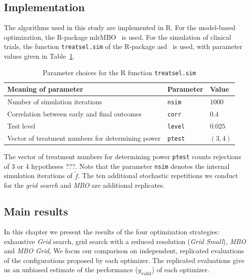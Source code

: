 \documentclass[bimj,fleqn]{w-art}
\theoremstyle{plain}
\theoremstyle{definition}
\begin{document}
\subsection{Implementation}

The algorithms used in this study are implemented in R.
For the model-based optimization, the R-package mlrMBO~\citep{bischl_mlrmbo_2017} is used.
For the simulation of clinical trials, the function \texttt{treatsel.sim} of the R-package asd~\citep{parsons_software_2011} is used, with parameter values given in Table~\ref{tab:par_implement}.
\begin{table}[h]
  \caption{Parameter choices for the R function \texttt{treatsel.sim}}
  \label{tab:par_implement}
  \centering
  \begin{tabular}{lll}
  \hline
  Meaning of parameter & Parameter & Value \\
  \hline
  Number of simulation iterations & \texttt{nsim} & $1000$ \\
  Correlation between early and final outcomes & \texttt{corr} & $0.4$ \\
  Test level & \texttt{level} & $0.025$ \\
  Vector of treatment numbers for determining power & \texttt{ptest} & $(3,4)$ \\
  \hline
  \end{tabular}
\end{table}
The vector of treatment numbers for determining power \texttt{ptest} counts rejections of 3 or 4 hypotheses ???.
Note that the parameter \texttt{nsim} denotes the internal simulation iterations of $\tilde{f}$. 
The ten additional stochastic repetitions we conduct for the \emph{grid search} and \emph{MBO} are additional replicates.


\subsection{Main results}

In this chapter we present the results of the four optimization strategies: exhaustive \emph{Grid} search, grid search with a reduced resolution (\emph{Grid Small}), \emph{MBO} and \emph{MBO Grid},
We focus our comparison on independent, replicated evaluations of the configurations proposed by each optimizer.
The replicated evaluations give us an unbiased estimate of the performance ($y_{\text{valid}}$) of each optimizer.
\end{document}
